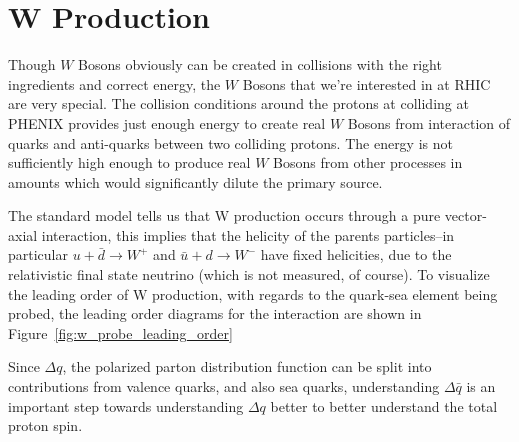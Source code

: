 \clearpage
\section{W Production}

Though $W$ Bosons obviously can be created in collisions with the right
ingredients and correct energy, the $W$ Bosons that we're interested in at RHIC
are very special. The collision conditions around the protons at colliding at
PHENIX provides just enough energy to create real $W$ Bosons from interaction of
quarks and anti-quarks between two colliding protons. The energy is not
sufficiently high enough to produce real $W$ Bosons from other processes in
amounts which would significantly dilute the primary source.

The standard model tells us that W production occurs through a pure vector-axial
interaction, this implies that the helicity of the parents particles--in
particular $u+\bar{d}\rightarrow W^+$ and $\bar{u}+d\rightarrow W^-$ have fixed
helicities, due to the relativistic final state neutrino (which is not measured,
of course). To visualize the leading order of W production, with regards to the
quark-sea element being probed, the leading order diagrams for the interaction
are shown in Figure~\ref{fig:w_probe_leading_order}~\cite{Aidala2005}

Since $\Delta q$, the polarized parton distribution function can be split into
contributions from valence quarks, and also sea quarks, understanding $\Delta
\bar{q}$ is an important step towards understanding $\Delta q$ better to better
understand the total proton spin.

